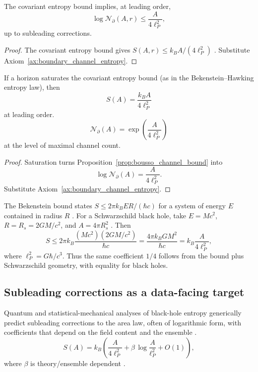 \begin{proposition}\label{prop:bousso_channel_bound}
The covariant entropy bound implies, at leading order,
\begin{equation}
\log \mathcal{N}_{\partial}(A,r)\le \frac{A}{4\ell_P^2},
\end{equation}
up to subleading corrections.
\end{proposition}
\begin{proof}
The covariant entropy bound gives $S(A,r)\le k_BA/(4\ell_P^2)$ \cite{Bousso2002}. Substitute Axiom~\ref{ax:boundary_channel_entropy}.
\end{proof}

\begin{theorem}\label{thm:area_law_channel_count}
If a horizon saturates the covariant entropy bound (as in the Bekenstein--Hawking entropy law), then
\begin{equation}
S(A)=\frac{k_BA}{4\ell_P^2}
\end{equation}
at leading order.
\begin{equation}
\mathcal{N}_{\partial}(A)=\exp\!\left(\frac{A}{4\ell_P^2}\right)
\end{equation}
at the level of maximal channel count.
\end{theorem}
\begin{proof}
Saturation turns Proposition~\ref{prop:bousso_channel_bound} into
\[
\log \mathcal{N}_{\partial}(A)=\frac{A}{4\ell_P^2}.
\]
Substitute Axiom~\ref{ax:boundary_channel_entropy}.
\end{proof}

\begin{remark}
The Bekenstein bound states $S\le 2\pi k_B ER/(\hbar c)$ for a system of energy $E$ contained in radius $R$ \cite{Bekenstein1981}. For a Schwarzschild black hole, take $E=Mc^2$, $R=R_s=2GM/c^2$, and $A=4\pi R_s^2$ \cite{Wald1984}. Then
\begin{equation}
S\le 2\pi k_B\frac{(Mc^2)(2GM/c^2)}{\hbar c}=\frac{4\pi k_B GM^2}{\hbar c}
=k_B\frac{A}{4\ell_P^2},
\end{equation}
where $\ell_P^2=G\hbar/c^3$. Thus the same coefficient $1/4$ follows from the bound plus Schwarzschild geometry, with equality for black holes.
\end{remark}

\subsection{Subleading corrections as a data-facing target}
Quantum and statistical-mechanical analyses of black-hole entropy generically predict subleading corrections to the area law, often of logarithmic form, with coefficients that depend on the field content and the ensemble \cite{Fursaev1995,KaulMajumdar2000,Sen2013LogBH}.
\begin{equation}
S(A)=k_B\left(\frac{A}{4\ell_P^2}+\beta\,\log\!\frac{A}{\ell_P^2}+O(1)\right),
\end{equation}
where $\beta$ is theory/ensemble dependent \cite{Fursaev1995,KaulMajumdar2000,Sen2013LogBH}.

